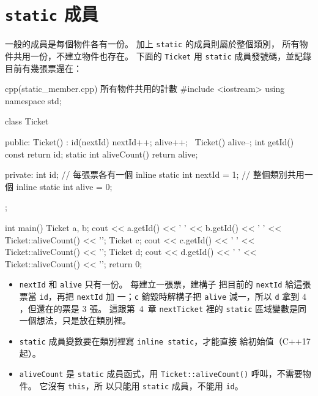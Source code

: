 \section{\texttt{static} 成員}
\label{sec:static-member}

一般的成員是每個物件各有一份。 加上 \texttt{static} 的成員則屬於整個類別，
所有物件共用一份，不建立物件也存在。 下面的 \texttt{Ticket} 用
\texttt{static} 成員發號碼，並記錄目前有幾張票還在：

\begin{example}[label=ex:static-member]{cpp}{(static\_member.cpp) 所有物件共用的計數}
#include <iostream>
using namespace std;

class Ticket {
public:
    Ticket() : id(nextId) {
        nextId++;
        alive++;
    }
    ~Ticket() {
        alive--;
    }
    int getId() const {
        return id;
    }
    static int aliveCount() {
        return alive;
    }

private:
    int id;                        // 每張票各有一個
    inline static int nextId = 1;  // 整個類別共用一個
    inline static int alive = 0;
};

int main() {
    Ticket a, b;
    cout << a.getId() << ' ' << b.getId() << ' ' << Ticket::aliveCount() << '\n';
    {
        Ticket c;
        cout << c.getId() << ' ' << Ticket::aliveCount() << '\n';
    }
    Ticket d;
    cout << d.getId() << ' ' << Ticket::aliveCount() << '\n';
    return 0;
}
\end{example}


\begin{itemize}
\item \texttt{nextId} 和 \texttt{alive} 只有一份。 每建立一張票，建構子
把目前的 \texttt{nextId} 給這張票當 \texttt{id}，再把 \texttt{nextId} 加
一；\texttt{c} 銷毀時解構子把 \texttt{alive} 減一，所以 \texttt{d} 拿到
$4$，但還在的票是 $3$ 張。 這跟第~4~章 \texttt{nextTicket} 裡的
\texttt{static} 區域變數是同一個想法，只是放在類別裡。
\item \texttt{static} 成員變數要在類別裡寫 \texttt{inline static}，才能直接
給初始值（C++17 起）。
\item \texttt{aliveCount} 是 \texttt{static} 成員函式，用
\texttt{Ticket::aliveCount()} 呼叫，不需要物件。 它沒有 \texttt{this}，所
以只能用 \texttt{static} 成員，不能用 \texttt{id}。
\end{itemize}

